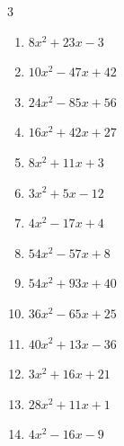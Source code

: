 \begin{multicols}{3}
\begin{enumerate}
        \phantom{$=(8x-7)(2x+5)$}

  \item $8x^{2}+23x-3$

        \phantom{$=(8x-1)(x+3)$}

  \item $10x^{2}-47x+42$

        \phantom{$=(2x-7)(5x-6)$}

  \item $24x^{2}-85x+56$

        \phantom{$=(8x-7)(3x-8)$}

  \item $16x^{2}+42x+27$

        \phantom{$=(8x+9)(2x+3)$}

  \item $8x^{2}+11x+3$

        \phantom{$=(8x+3)(x+1)$}

  \item $3x^{2}+5x-12$

        \phantom{$=(3x-4)(x+3)$}

  \item $4x^{2}-17x+4$

        \phantom{$=(4x-1)(x-4)$}

\columnbreak %

  \item $54x^{2}-57x+8$

        \phantom{$=(9x-8)(6x-1)$}

  \item $54x^{2}+93x+40$

        \phantom{$=(6x+5)(9x+8)$}

  \item $36x^{2}-65x+25$

        \phantom{$=(9x-5)(4x-5)$}

  \item $40x^{2}+13x-36$

        \phantom{$=(5x-4)(8x+9)$}

  \item $3x^{2}+16x+21$

        \phantom{$=(x+3)(3x+7)$}

  \item $28x^{2}+11x+1$

        \phantom{$=(4x+1)(7x+1)$}

  \item $4x^{2}-16x-9$

        \phantom{$=(2x-9)(2x+1)$}


\end{enumerate}
\end{multicols}
